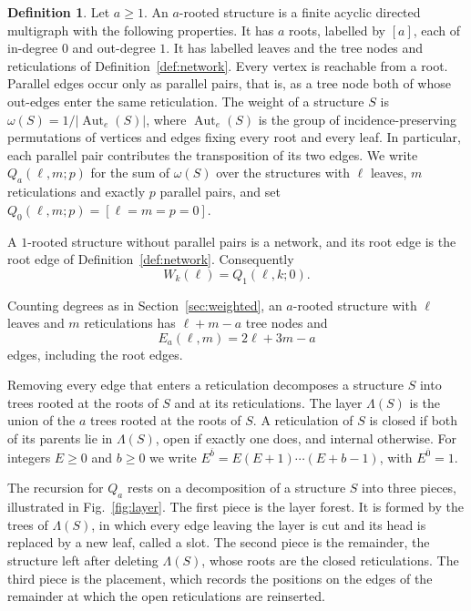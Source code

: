 \documentclass[11pt,a4paper]{article}
\theoremstyle{definition}
\newtheorem{definition}[theorem]{Definition}
\newcommand{\Aut}{\operatorname{Aut}}
\newcommand{\rise}[2]{#1^{\overline{#2}}}
\begin{document}
\begin{definition}\label{def:arooted}
Let $a\ge1$. An $a$-rooted structure is a finite acyclic directed multigraph with the following properties. It has $a$ roots, labelled by $[a]$, each of in-degree $0$ and out-degree $1$. It has labelled leaves and the tree nodes and reticulations of Definition~\ref{def:network}. Every vertex is reachable from a root. Parallel edges occur only as parallel pairs, that is, as a tree node both of whose out-edges enter the same reticulation. The weight of a structure $S$ is $\omega(S)=1/|\Aut_e(S)|$, where $\Aut_e(S)$ is the group of incidence-preserving permutations of vertices and edges fixing every root and every leaf. In particular, each parallel pair contributes the transposition of its two edges. We write $Q_a(\ell,m;p)$ for the sum of $\omega(S)$ over the structures with $\ell$ leaves, $m$ reticulations and exactly $p$ parallel pairs, and set $Q_0(\ell,m;p)=[\ell=m=p=0]$.
\end{definition}

A $1$-rooted structure without parallel pairs is a network, and its root edge is the root edge of Definition~\ref{def:network}. Consequently
\begin{equation}\label{eq:WQ}
W_k(\ell)=Q_1(\ell,k;0).
\end{equation}

Counting degrees as in Section~\ref{sec:weighted}, an $a$-rooted structure with $\ell$ leaves and $m$ reticulations has $\ell+m-a$ tree nodes and
\begin{equation}\label{eq:edges}
E_a(\ell,m)=2\ell+3m-a
\end{equation}
edges, including the root edges.

Removing every edge that enters a reticulation decomposes a structure $S$ into trees rooted at the roots of $S$ and at its reticulations. The layer $\Lambda(S)$ is the union of the $a$ trees rooted at the roots of $S$. A reticulation of $S$ is closed if both of its parents lie in $\Lambda(S)$, open if exactly one does, and internal otherwise. For integers $E\ge0$ and $b\ge0$ we write $\rise{E}{b}=E(E+1)\cdots(E+b-1)$, with $\rise{E}{0}=1$.

The recursion for $Q_a$ rests on a decomposition of a structure $S$ into three pieces, illustrated in Fig.~\ref{fig:layer}. The first piece is the layer forest. It is formed by the trees of $\Lambda(S)$, in which every edge leaving the layer is cut and its head is replaced by a new leaf, called a slot. The second piece is the remainder, the structure left after deleting $\Lambda(S)$, whose roots are the closed reticulations. The third piece is the placement, which records the positions on the edges of the remainder at which the open reticulations are reinserted.
\end{document}
